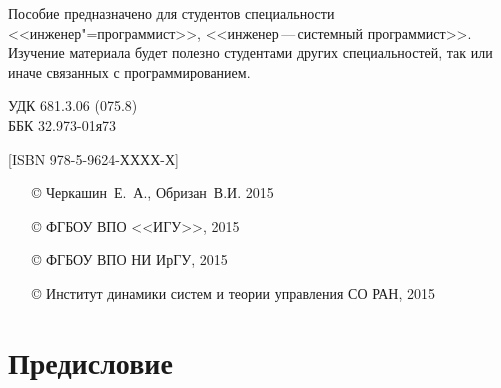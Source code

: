 \documentclass[14pt, openany, twoside, draft]{extbook} %
\newcommand{\e}[2][fcolor]{\textcolor{pcolor}{[}\textcolor{#1}{#2}\textcolor{pcolor}{]}}
\begin{document}
\begin{mygroup}
\begin{minipage}[t]{0.95\linewidth}
    Пособие предназначено для студентов специальности <<инженер"=программист>>, <<инженер\,---\,системный программист>>. Изучение материала будет полезно студентами других специальностей, так или иначе связанных с программированием.

\mbox{}
\endgroup
\end{minipage}
\mbox{}\hspace{0.7\linewidth}
\begin{minipage}{0.3\linewidth}\small
\noindent УДК 681.3.06 (075.8)\\
\noindent ББК 32.973-01я73
\end{minipage}

\vfill
\noindent\begin{minipage}[t]{0.35\linewidth}\small
\noindent \e{ISBN 978-5-9624-ХХХХ-Х}
\end{minipage}%
\begin{minipage}[t]{0.65\linewidth}\small
\begin{itemize}
\setlength{\itemsep}{-0.5ex}
\setlength{\parsep}{0pt}
\item[\copyright{}] Черкашин~Е.~А., Обризан~В.И. 2015
\item[\copyright{}] ФГБОУ ВПО <<ИГУ>>, 2015
\item[\copyright{}] ФГБОУ ВПО НИ ИрГУ, 2015
\item[\copyright{}] Институт динамики систем и теории управления СО РАН, 2015
\end{itemize}
\end{minipage}
\end{mygroup}
\clearpage
\tableofcontents
\clearpage

\newpage
\chapter*{Предисловие}
\end{document}

